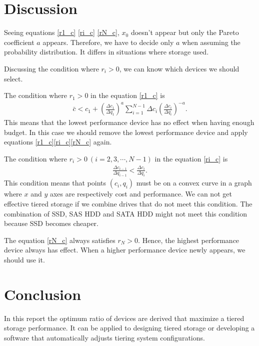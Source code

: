 \documentclass[a4paper,11pt]{article}
\begin{document}
\section{Discussion}


Seeing equations \eqref{r1_c} \eqref{ri_c} \eqref{rN_c}, $x_0$ doesn't
appear but only the Pareto coefficient $a$ appears. Therefore, we have to
decide only $a$ when assuming the probability distribution. It differs in situations where storage used.


Discussing the condition where $r_i > 0$, we can know which devices we
should select.


The condition where $r_1 > 0$ in the equation \eqref{r1_c} is
\begin{eqnarray}
  \bar{c} < c_1 + \left(\frac{\Delta c_1}{\Delta q_1}\right)^a \sum_{i=1}^{N-1}\Delta c_i
    \left(\frac{\Delta c_i}{\Delta q_i}\right)^{-a}. \label{over_budget}
\end{eqnarray}
This means that the lowest performance device has no effect when having
enough budget. In this case we should remove the lowest performance device and apply
equations \eqref{r1_c}\eqref{ri_c}\eqref{rN_c} again.


The condition where $r_i > 0\ (i = 2, 3, \cdots, N-1)$ in the equation
\eqref{ri_c} is
\begin{eqnarray}
  \frac{\Delta c_{i-1}}{\Delta q_{i-1}} < \frac{\Delta c_i}{\Delta q_i}.
  \label{satuation}
\end{eqnarray}
This condition means that points $(c_i, q_i)$ must be on a convex curve
in a graph where $x$ and $y$ axes are respectively cost and performance.
We can not get effective tiered storage if we combine drives that do not
meet this condition. The combination of SSD, SAS HDD and SATA HDD might
not meet this condition because SSD becomes cheaper.


The equation \eqref{rN_c} always satisfies $r_N > 0$. Hence, the highest
performance device always has effect. When a higher performance device
newly appears, we should use it.


\section{Conclusion}

In this report the optimum ratio of devices are derived that maximize a
tiered storage performance.
It can be applied to designing tiered storage or developing a software
that automatically adjusts tiering system configurations.
\end{document}
